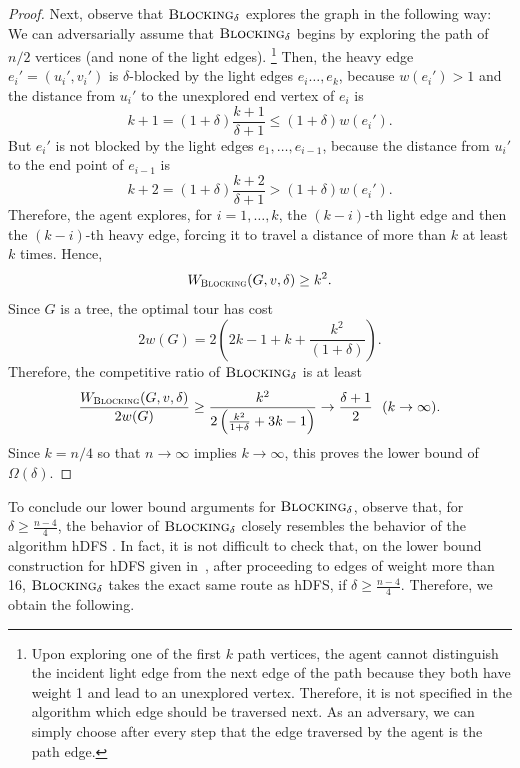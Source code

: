 \documentclass[a4paper,cleveref, autoref, thm-restate, thm-restate, UKenglish]{lipics-v2021}
\newcommand{\blocking}{\textsc{Blocking}}
\newcommand{\cost}{W_{\blocking}}
\begin{document}
\begin{proof}
Next, observe that $\blocking_\delta$ explores the graph in the following way:
We can adversarially assume
that $\blocking_\delta$ begins by exploring the path of $n/2$ vertices (and none of the light edges).
\footnote{Upon exploring one of the first $k$ path vertices, the agent cannot distinguish  the incident light edge from the next edge of the path because they both have weight 1 and lead to an unexplored vertex. Therefore, it is not specified in the algorithm which edge should be traversed next. As an adversary, we can simply choose after every step that the edge traversed by the agent is the path edge.} Then, the heavy edge $e_i'=(u_i',v_i')$ is $\delta$-blocked by the light edges $e_i \dots, e_k$, because $w(e_i')>1$ and the distance from $u_i'$ to the
unexplored
end vertex of $e_i$ is
\begin{equation*}
	k+1=(1+\delta) \frac{k+1}{\delta+1} \leq (1+\delta) w(e_i').
\end{equation*}
But $e_i'$ is not blocked by the light edges $e_1, \dots, e_{i-1}$, because the distance from $u_i'$ to the end point of $e_{i-1}$ is
\begin{equation*}
	k+2=(1+\delta) \frac{k+2}{\delta+1} > (1+\delta) w(e_i').
\end{equation*}
 Therefore, the agent explores, for $i=1, \dots, k$, the $(k-i)$-th light edge and then the $(k-i)$-th heavy edge, forcing it to travel a distance of more than $k$ at least $k$ times.
 Hence,
\begin{equation*}
\cost(G,v, \delta)\geq k^2.
\end{equation*}
Since $G$ is a tree, the optimal tour has cost 
\begin{equation*}
2w(G)=2 \left(2k-1+k + \frac{k^2}{(1+\delta)}\right).
\end{equation*}
Therefore, the competitive ratio of $\blocking_\delta$ is at least
\begin{equation*}
\frac{\cost (G,v, \delta)}{2 w(G)}\geq \frac{k^2}{2\left(\frac{k^2}{1+\delta}+3k-1\right)}\to \frac{\delta+1}{2} ~~ (k \to \infty).
\end{equation*}
Since $k=n/4$ so that $n \to \infty$ implies $k\to \infty$, this proves the lower bound of $\Omega(\delta)$.
\end{proof}


To conclude our lower bound arguments for $\blocking_\delta$, observe that, for $\delta\geq \frac{n-4}{4}$, the behavior of $\blocking_\delta$ closely resembles the behavior of the algorithm hDFS \cite{megow}. In fact, it is not difficult to check that, on the lower bound construction for hDFS given \hbox{in~\cite[Theorem 5]{megow}}, after proceeding to edges of weight more than 16, $\blocking_\delta$ takes the exact same route as hDFS, if $\delta\geq \frac{n-4}{4}$. Therefore, we obtain the following.
\end{document}
